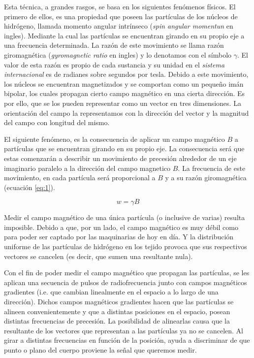 \documentclass[11pt,a4paper,twoside]{tesis}
\begin{document}
Esta t\'ecnica, a grandes rasgos, se basa en los siguientes fen\'omenos f\'isicos. El primero de 
ellos, es 
una propiedad que poseen las part\'iculas de los n\'ucleos de hidr\'ogeno, 
llamada momento angular intrínseco (\textit{spin angular momentun} en ingles). 
Mediante la cual las part\'iculas se encuentran girando en su 
propio eje a una frecuencia determinada. La razón de este movimiento se llama razón 
giromagnética (\textit{gyromagnetic 
ratio} en ingles) y lo denotamos con el símbolo $\gamma$. El valor de esta 
razón es propio de cada sustancia y su unidad en el 
\textit{sistema internacional} es de radianes sobre segundos por tesla. Debido 
a este movimiento, los n\'ucleos se encuentran 
magnetizados y se comportan como un peque\~no im\'an bipolar, los cuales 
propagan cierto campo magn\'etico en una cierta direcci\'on. Es por ello, que se los pueden 
representar como un vector en tres dimensiones. La orientaci\'on del campo la representamos con 
la direcci\'on del vector y la magnitud del campo con longitud del mismo.

El siguiente fen\'omeno, es la consecuencia de aplicar un campo magnético $B$ a partículas que se 
encuentran girando en su propio eje. La consecuencia será que estas comenzarán a describir un 
movimiento de precesi\'on alrededor de un eje imaginario paralelo a la direcci\'on del campo 
magnetico $B$. La frecuencia de este movimiento, en cada part\'icula será proporcional a $B$ y a su 
razón giromagnética (ecuación \ref{eq:1}).

\begin{equation} 
\label{eq:1}
 w=\gamma  B
\end{equation}


Medir el campo magn\'etico de una \'unica part\'icula (o inclusive de varias) resulta imposible. 
Debido a que, por un lado, el campo magn\'etico es muy d\'ebil como para poder ser captado por las 
maquinarias de hoy en d\'ia. Y la distribuci\'on uniforme de las part\'iculas 
de hidr\'ogeno en los tejido provoca que sus respectivos vectores se cancelen (es decir, que sumen 
una resultante nula). 

Con el fin de poder medir el campo magnético que propagan las partículas, se les aplican una 
secuencia de pulsos de radiofrecuencia junto con campos magnéticos gradientes (i.e. que cambian 
linealmente en el espacio a lo largo de una direcci\'on). Dichos campos magn\'eticos gradientes 
hacen que las part\'iculas se alineen convenientemente y que a distintas posiciones en el espacio, 
posean distintas frecuencias de precesi\'on. La posibilidad de alinearlas causa que la resultante de 
los vectores que representan a las part\'iculas ya no se cancelen. Al girar a distintas 
frecuencias en funci\'on de la posici\'on, ayuda a discriminar de que punto o plano del cuerpo 
proviene la se\~nal que queremos medir.
\end{document}
